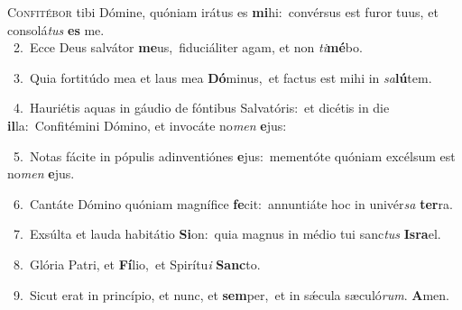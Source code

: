 \lettrine{\initial\textcolor{\initialcolor}{C}}{onfitébor} tibi Dómine, quóniam irátus es \textbf{mi}\-hi:~\star convérsus est furor tuus, et consolá\textit{tus} \textbf{es} me.\\
{\numbfont\textcolor{\numbcolor}{~2.}}~Ecce Deus salvátor \textbf{me}\-us,~\star fiduciáliter agam, et non \textit{ti}\-\textbf{mé}bo.\par
{\numbfont\textcolor{\numbcolor}{~3.}}~Quia fortitúdo mea et laus mea \textbf{Dó}\-minus,~\star et factus est mihi in \textit{sa}\-\textbf{lú}tem.\par
{\numbfont\textcolor{\numbcolor}{~4.}}~Hauriétis aquas in gáudio de fóntibus Salvatóris:~\dagger et dicétis in die \textbf{il}\-la:~\star Confitémini Dómino, et invocáte no\textit{men} \textbf{e}\-jus:\par
{\numbfont\textcolor{\numbcolor}{~5.}}~Notas fácite in pópulis adinventiónes \textbf{e}\-jus:~\star mementóte quóniam excélsum est no\textit{men} \textbf{e}\-jus.\par
{\numbfont\textcolor{\numbcolor}{~6.}}~Cantáte Dómino quóniam magnífice \textbf{fe}\-cit:~\star annuntiáte hoc in univér\textit{sa} \textbf{ter}\-ra.\par
{\numbfont\textcolor{\numbcolor}{~7.}}~Exsúlta et lauda habitátio \textbf{Si}\-on:~\star quia magnus in médio tui sanc\textit{tus} \textbf{Is}\-\textbf{ra}el.\par
{\numbfont\textcolor{\numbcolor}{~8.}}~Glória Patri, et \textbf{Fí}\-lio,~\star et Spirítu\textit{i} \textbf{Sanc}\-to.\par
{\numbfont\textcolor{\numbcolor}{~9.}}~Sicut erat in princípio, et nunc, et \textbf{sem}\-per,~\star et in sǽcula sæculó\-\textit{rum}\-. \textbf{A}\-men.\par
